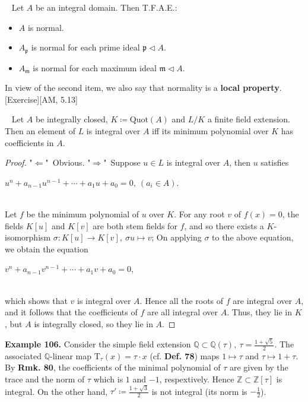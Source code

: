\documentclass[12pt,a4paper,footinclude=true,headinclude=true]{scrbook} %
\newenvironment{proposition}[2][]
{\renewcommand\theinnercustomprop{#2}\innercustomprop[#1] 
\begin{mdframed}[backgroundcolor=gray!20]\ }
{\end{mdframed}\endinnercustomprop}
\newenvironment{example}[2][Example]
    { \begin{mdframed}[backgroundcolor=gray!20] \textbf{#1 #2.} }
    {  \end{mdframed}}
\begin{document}
\newpage
\begin{proposition}{104}
    Let $A$ be an integral domain. Then T.F.A.E.:
    \begin{itemize}
        \item[(a)] $A$ is normal.
        \item[(b)] $A_\mathfrak{p}$ is normal for each prime ideal $\mathfrak{p} \triangleleft A$.
        \item[(c)] $A_\mathfrak{m}$ is normal for each maximum ideal $\mathfrak{m}\triangleleft A$.
    \end{itemize}
    In view of the second item, we also say that normality is a \textbf{local property}. [Exercise][AM, 5.13]
\end{proposition}

\begin{proposition}{105}
    Let $A$ be integrally closed, $K\coloneqq\mathrm{Quot}(A)$ and $L/K$ a finite field extension. Then an element of $L$ is integral over $A$ iff its minimum polynomial over $K$ has coefficients in $A$.
\end{proposition}
\begin{proof}
    "$\Leftarrow$"\ Obvious. "$\Rightarrow$"\ Suppose $u\in L$ is integral over $A$, then $u$ satisfies \\  \centerline{$u^n+a_{n-1}u^{n-1}+\cdots+a_1u+a_0=0,\ (a_i\in A)$.}\\ Let $f$ be the minimum polynomial of $u$ over $K$. For any root $v$ of $f(x)=0$, the fields $K[u]$ and $K[v]$ are both stem fields for $f$, and so there exists a $K$-isomorphism $\sigma:K[u]\to K[v],\ \sigma u\mapsto v$; On applying $\sigma$ to the above equation, we obtain the equation \\ \centerline{$v^n+a_{n-1}v^{n-1}+\cdots+a_1v+a_0=0$,} \\ which shows that $v$ is integral over $A$. Hence all the roots of $f$ are integral over $A$, and it follows that the coefficients of $f$ are all integral over $A$. Thus, they lie in $K$, but $A$ is integrally closed, so they lie in $A$.
\end{proof}

\begin{example}{106}
    Consider the simple field extension $\mathbb{Q}\subset\mathbb{Q}(\tau), \ \tau=\frac{1+\sqrt{5}}{2}$. The associated $\mathbb{Q}$-linear map $\mathrm{T}_\tau(x)=\tau\cdot x$ (cf. \textbf{Def. 78}) maps $1\mapsto \tau$ and $\tau\mapsto1+\tau$. By \textbf{Rmk. 80}, the coefficients of the minimal polynomial of $\tau$ are given by the trace and the norm of $\tau$ which is $1$ and $-1$, respextively. Hence $\mathbb{Z}\subset\mathbb{Z}[\tau]$ is integral. On the other hand, $\tau'\coloneqq\frac{1+\sqrt{3}}{2}$ is not integral (its norm is $-\frac{1}{2}$).
\end{example}
\newpage
\end{document}
